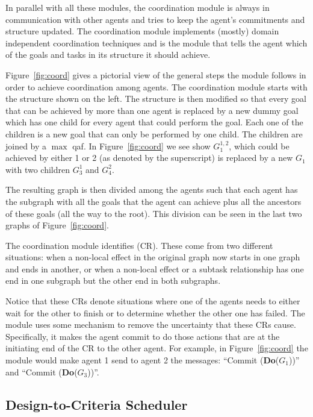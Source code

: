 In parallel with all these modules, the  coordination module is
always in communication with other agents and tries to keep the
agent's commitments and \taems{} structure updated. The 
coordination module implements (mostly) domain independent
coordination techniques and is the module that tells the agent which
of the goals and tasks in its \taems{} structure it should achieve.

Figure~\ref{fig:coord} gives a pictorial view of the general steps the
 module follows in order to achieve coordination among agents. The
coordination module starts with the \taems{} structure shown on the
left. The structure is then modified so that every goal that can be
achieved by more than one agent is replaced by a new dummy goal which
has one child for every agent that could perform the goal. Each one of
the children is a new goal that can only be performed by one child.
The children are joined by a $\max$ qaf. In Figure~\ref{fig:coord} we
see show $G_1^{1,2}$, which could be achieved by either 1 or 2 (as
denoted by the superscript) is replaced by a new $G_1$ with two
children $G_3^1$ and $G_4^2$.

The resulting graph is then divided among the agents such that each
agent has the subgraph with all the goals that the agent can achieve
plus all the ancestors of these goals (all the way to the root). This
division can be seen in the last two graphs of Figure~\ref{fig:coord}.

The  coordination module identifies  (CR). These come from two different situations: when
a non-local effect in the original graph now starts in one graph and
ends in another, or when a non-local effect or a subtask relationship
has one end in one subgraph but the other end in both subgraphs.

Notice that these CRs denote situations where one of the agents needs
to either wait for the other to finish or to determine whether the
other one has failed. The  module uses some mechanism to remove
the uncertainty that these CRs cause. Specifically, it makes the agent
commit to do those actions that are at the initiating end of the CR to
the other agent. For example, in Figure~\ref{fig:coord} the 
module would make agent 1 send to agent 2 the messages: ``Commit
(\textbf{Do}($G_1$))'' and ``Commit (\textbf{Do}($G_3$))''.


\subsection{Design-to-Criteria Scheduler}

